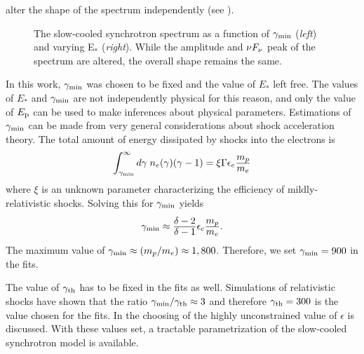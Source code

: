 alter the shape of the spectrum independently (see ). 
\begin{figure}[t]
  \centering

  
\caption{The slow-cooled synchrotron spectrum as a function of
  $\gamma_{\rm min}$ (\emph{left}) and varying E$_*$ (\emph{right}). While
  the amplitude and $\nu F_{\nu}$ peak of the spectrum are altered, the
  overall shape remains the same.}
  \label{fig:scalep}
\end{figure}
In this work, $\gamma_{\rm min}$ was chosen to be fixed and the value of
$E_*$ left free. The values of $E_*$ and $\gamma_{\rm min}$ are not
independently physical for this reason, and only the value of $E_{\rm p}$
can be used to make inferences about physical parameters. Estimations
of $\gamma_{\rm min}$ can be made from very general considerations about
shock acceleration theory. The total amount of energy dissipated by shocks into the electrons is
\begin{equation}
  \label{eq:gammamin}
  \int_{\gammaMin}^{\infty}d\gamma\; n_e(\gamma)(\gamma-1) = \xi \Gamma \epsilon_e \dover{m_p}{m_e}
\end{equation}
where $\xi$ is an unknown parameter characterizing the efficiency of
mildly-relativistic shocks. Solving this for $\gamma_{\rm min}$ yields
\begin{equation}
  \label{eq:gminth}
  \gammaMin \approx \dover{\delta - 2}{\delta -1}\epsilon_c \dover{m_p}{m_e}.
\end{equation}
The maximum value of $\gamma_{\rm min}\approx (m_p/m_e)\approx
1,800$. Therefore, we set $\gamma_{\rm min}=900$ in the fits.

The value of $\gamma_{\rm th}$ has to be fixed in the fits as well. Simulations
of relativistic shocks have shown that the ratio
$\gamma_{\rm min}/\gamma_{\rm th}\approx 3$ and therefore $\gamma_{\rm th}=300$ is the value
chosen for the fits. In  the choosing of the highly
unconstrained value of $\epsilon$ is discussed. With these values set,
a tractable parametrization of the slow-cooled synchrotron model is
available.




